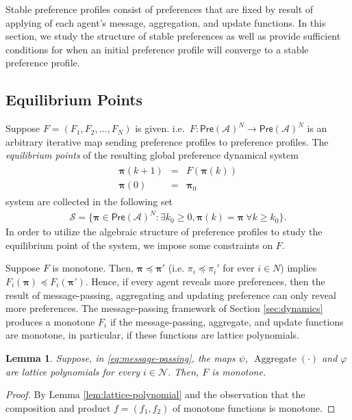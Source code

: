 \documentclass[conference]{ieeeconf}
\newcommand{\N}{\mathcal{N}}
\newcommand{\A}{\mathcal{A}}
\renewcommand{\SS}{\mathcal{S}}
\newcommand{\Pref}{\mathsf{Pre}}
\newcommand{\profile}{\boldsymbol{\pi}}
\renewcommand{\geq}{\geqslant}
\DeclareMathOperator{\Aggregate}{Aggregate}
\newtheorem{lemma}{Lemma}
\begin{document}
Stable preference profiles consist of preferences that are fixed by result of applying of each agent's message, aggregation, and update functions. In this section, we study the structure of stable preferences as well as provide sufficient conditions for when an initial preference profile will converge to a stable preference profile.

\subsection{Equilibrium Points}

Suppose $F = (F_1,F_2,\dots,F_N)$ is given. i.e.~$F: \Pref(\A)^N \to \Pref(\A)^N$ is an arbitrary iterative map sending preference profiles to preference profiles. The \emph{equilibrium points} of the resulting global preference dynamical system
\begin{align}
    \begin{aligned}
        \profile(k+1) &=& F\left( \profile(k) \right) \\
        \profile(0) &=& \profile_0
    \end{aligned} \label{eq:global-pi}
\end{align}
system are collected in the following set
\begin{align*}
    \SS = \{\profile \in \Pref(\A)^N : \exists k_0 \geq 0, \profile(k) = \profile~\forall k \geq k_0\}.
\end{align*}
In order to utilize the algebraic structure of preference profiles to study the equilibrium point of the system, we impose some constraints on $F$. 

Suppose $F$ is monotone. Then, $\profile \preceq \profile'$ (i.e. $\pi_i \preceq \pi_i'$ for ever $i \in N$) implies $F_i(\profile) \preceq F_i(\profile')$. Hence, if every agent reveals more preferences, then the result of message-passing, aggregating and updating preference can only reveal more preferences. The message-passing framework of Section \ref{sec:dynamics} produces a monotone $F_i$ if the message-passing, aggregate, and update functions are monotone, in particular, if these functions are lattice polynomials.

\begin{lemma} \label{lem:message-passing}
    Suppose, in \eqref{eq:message-passing}, the maps $\psi$, $\Aggregate(\cdot)$ and $\varphi$ are lattice polynomials for every $i \in \N$. Then, $F$ is monotone.
\end{lemma}
\begin{proof}
    By Lemma \ref{lem:lattice-polynomial} and the observation that the composition and product $f = (f_1,f_2)$ of monotone functions is monotone.
\end{proof}
\end{document}

